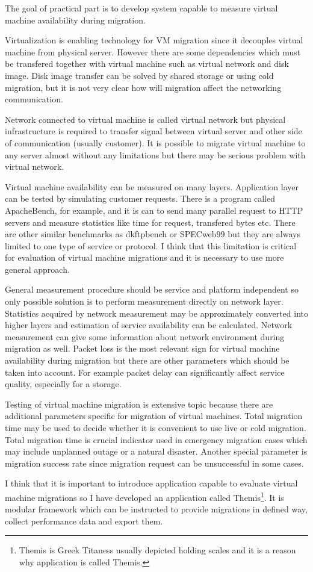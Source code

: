 
The goal of practical part is to develop system capable to measure virtual machine availability during migration. 

Virtualization is enabling technology for \Ac{VM} migration since it decouples virtual machine from physical server. However there are some dependencies which must be transfered together with virtual machine such as virtual network and disk image. Disk image transfer can be solved by shared storage or using cold migration, but it is not very clear how will migration affect the networking communication.

Network connected to virtual machine is called virtual network but physical infrastructure is required to transfer signal between virtual server and other side of communication (usually customer). It is possible to migrate virtual machine to any server almost without any limitations but there may be serious problem with virtual network. 

Virtual machine availability can be measured on many layers. Application layer can be tested by simulating customer requests. There is a program called ApacheBench, for example, and it is can to send many parallel request to \Ac{HTTP} servers and measure statistics like time for request, transfered bytes etc. There are other similar benchmarks as dkftpbench or SPECweb99 but they are always limited to one type of service or protocol. I think that this limitation is critical for evaluation of virtual machine migrations and it is necessary to use more general approach.

General measurement procedure should be service and platform independent so only possible solution is to perform measurement directly on network layer. Statistics acquired by network measurement may be approximately converted into higher layers and estimation of service availability can be calculated. Network measurement can give some information about network environment during migration as well. Packet loss is the most relevant sign for virtual machine availability during migration but there are other parameters which should be taken into account. For example packet delay can significantly affect service quality, especially for a storage.

Testing of virtual machine migration is extensive topic because there are additional parameters specific for migration of virtual machines. Total migration time may be used to decide whether it is convenient to use live or cold migration. Total migration time is crucial indicator used in emergency migration cases which may include unplanned outage or a natural disaster. Another special parameter is migration success rate since migration request can be unsuccessful in some cases.

I think that it is important to introduce application capable to evaluate virtual machine migrations so I have developed an application called Themis\footnote{Themis is Greek Titaness usually depicted holding scales and it is a reason why application is called Themis.}. It is modular framework which can be instructed to provide migrations in defined way, collect performance data and export them.
